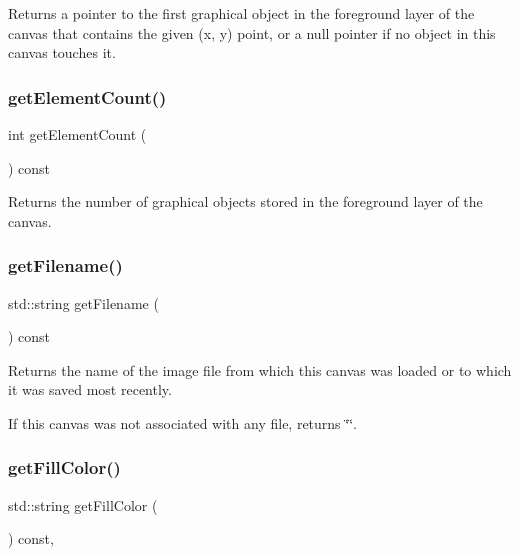 Returns a pointer to the first graphical object in the foreground layer of the canvas that contains the given (x, y) point, or a null pointer if no object in this canvas touches it. 

\mbox{\label{classGCanvas_adf7d37ec315f859648def92e6b32408f}} 
\subsubsection{\texorpdfstring{get\+Element\+Count()}{getElementCount()}}
{\footnotesize\ttfamily int get\+Element\+Count (\begin{DoxyParamCaption}{ }\end{DoxyParamCaption}) const\hspace{0.3cm}{\ttfamily [virtual]}}



Returns the number of graphical objects stored in the foreground layer of the canvas. 

\mbox{\label{classGCanvas_a2011812670c3de9747702e3c052b6bb3}} 
\subsubsection{\texorpdfstring{get\+Filename()}{getFilename()}}
{\footnotesize\ttfamily std\+::string get\+Filename (\begin{DoxyParamCaption}{ }\end{DoxyParamCaption}) const\hspace{0.3cm}{\ttfamily [virtual]}}



Returns the name of the image file from which this canvas was loaded or to which it was saved most recently. 

If this canvas was not associated with any file, returns \char`\"{}\char`\"{}. \mbox{\label{classGDrawingSurface_a76f6964a11fde7c78e9751be184e1a3c}} 
\subsubsection{\texorpdfstring{get\+Fill\+Color()}{getFillColor()}}
{\footnotesize\ttfamily std\+::string get\+Fill\+Color (\begin{DoxyParamCaption}{ }\end{DoxyParamCaption}) const\hspace{0.3cm}{\ttfamily [virtual]}, {\ttfamily [inherited]}}



